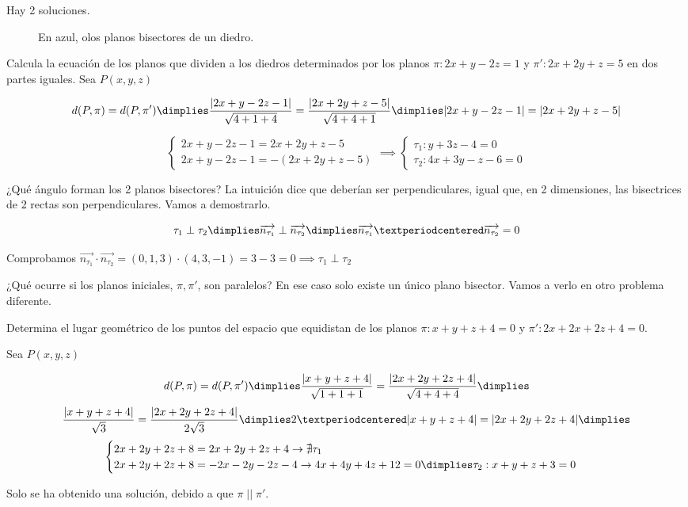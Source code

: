 Hay 2 soluciones.

\begin{figure}[H]
\centering
{}

\caption{En azul, olos planos bisectores de un diedro.}
\label{fig::planos-bisectores}
\end{figure}

\begin{problem}
Calcula la ecuación de los planos que dividen a los diedros determinados por los planos $\pi:2x+y-2z=1$ y $\pi': 2x+2y+z=5$ en dos partes iguales.
\solution
Sea $P(x,y,z)$

\[d(P,\pi) = d(P,\pi') \dimplies \frac{|2x+y-2z-1|}{\sqrt{4+1+4}} = \frac{|2x+2y+z-5|}{\sqrt{4+4+1}} \dimplies |2x+y-2z-1| = |2x+2y+z-5|\]

\[
\begin{cases}
2x+y-2z-1 = 2x+2y+z-5\\
2x+y-2z-1 =-\left(2x+2y+z-5\right)
\end{cases}\implies 
\begin{cases}
\tau_1: y+3z-4 = 0\\
\tau_2: 4x+3y-z-6=0
\end{cases}
\]


\obs ¿Qué ángulo forman los 2 planos bisectores? La intuición dice que deberían ser perpendiculares, igual que, en 2 dimensiones, las bisectrices de 2 rectas son perpendiculares. 
%
Vamos a demostrarlo.

\[
\tau_1 \perp\tau_2 \dimplies \vec{n_{\tau_1}} \perp \vec{n_{\tau_2}} \dimplies \vec{n_{\tau_1}}·\vec{n_{\tau_2}} = 0
\]

Comprobamos $\vec{n_{\tau_1}}·\vec{n_{\tau_2}} = (0,1,3)·(4,3,-1) = 3-3=0\implies \tau_1 \perp\tau_2 $

¿Qué ocurre si los planos iniciales, $\pi,\pi'$, son paralelos? En ese caso solo existe un único plano bisector. Vamos a verlo en otro problema diferente.
\end{problem}

\begin{problem}

Determina el lugar geométrico de los puntos del espacio que equidistan de los planos $\pi: x+y+z+4=0$ y $\pi':2x+2x+2z+4=0$.

\solution

Sea $P(x,y,z)$

\[
  d(P,\pi) = d(P,\pi') \dimplies \frac{|x+y+z+4|}{\sqrt{1+1+1}} = \frac{|2x+2y+2z+4|}{\sqrt{4+4+4}} \dimplies 
\]
\[
  \frac{|x+y+z+4|}{\sqrt{3}} = \frac{|2x+2y+2z+4|}{2\sqrt{3}} \dimplies 2·|x+y+z+4| = |2x+2y+2z+4|\dimplies 
\]
\[
\begin{cases}
  2x+2y+2z+8=2x+2y+2z+4 \to \nexists \tau_1\\
  2x+2y+2z+8=-2x-2y-2z-4 \to 4x+4y+4z+12 = 0 \dimplies \tau_2: x+y+z+3=0
\end{cases}
\]

Solo se ha obtenido una solución, debido a que $\pi\;||\;\pi'$.
\end{problem}


